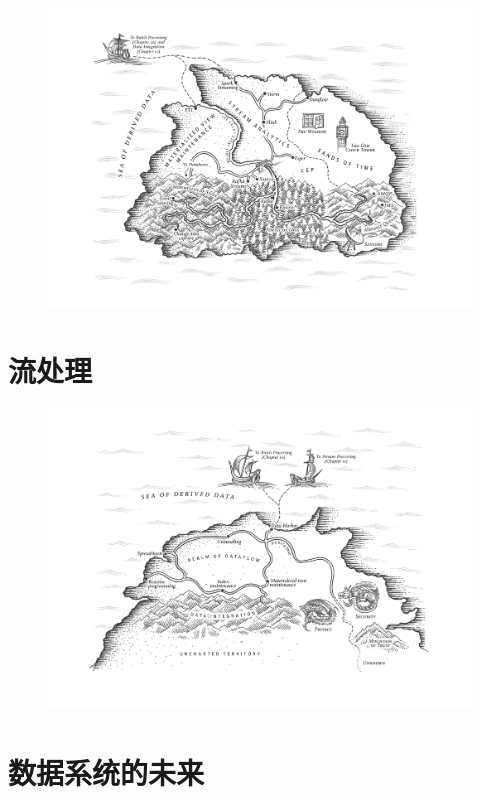 \documentclass{book}
\begin{document}
\newpage
\begin{figure}
  \centering
  \includegraphics[width=\textwidth]{img/ch11.png}
  \label{fig:ch11}
\end{figure}

\chapter{流处理}
\label{ch:ch11}

\newpage
\begin{figure}
  \centering
  \includegraphics[width=\textwidth]{img/ch12.png}
  \label{fig:ch12}
\end{figure}

\chapter{数据系统的未来}
\label{ch:ch12}
\end{document}
